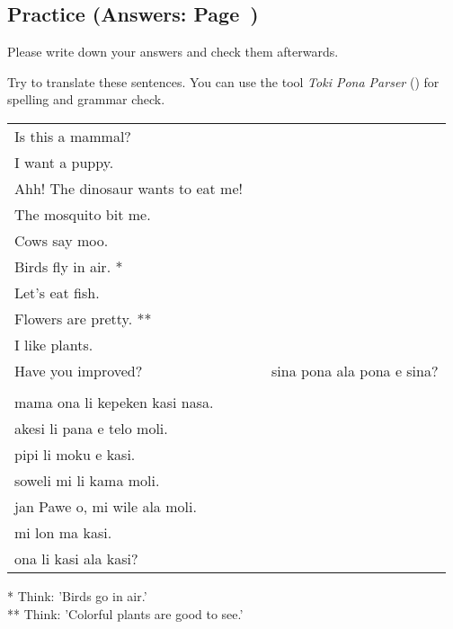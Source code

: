 \subsection*{Practice (Answers: Page~\pageref{'living_things'})}
%
Please write down your answers and check them afterwards. 

Try to translate these sentences. 
You can use the tool \textit{Toki Pona Parser} (\cite{www:rowa:02}) for spelling and grammar check. 

\begin{supertabular}{p{5,5cm}|ll}
Is this a mammal? &&  \\ %
I want a puppy. &&   \\ %
Ahh! The dinosaur wants to eat me!  &&  \\ %
The mosquito bit me.  &&  \\ %
Cows say moo.  &&  \\ %
Birds fly in air. * &&  \\ %
Let's eat fish.  &&  \\ %
Flowers are pretty. ** &&  \\ %
I like plants. &&   \\ %
Have you improved? && sina pona ala pona e sina? \\ %
 && \\ %
mama ona li kepeken kasi nasa.  &&  \\ %
akesi li pana e telo moli. &&  \\  %
pipi li moku e kasi.  &&  \\ %
soweli mi li kama moli.  &&  \\ %
jan Pawe o, mi wile ala moli. && \\   %
mi lon ma kasi. &&   \\ %
ona li kasi ala kasi? &&   \\ %
\end{supertabular} 

* Think: 'Birds go in air.' \\
** Think: 'Colorful plants are good to see.' 
